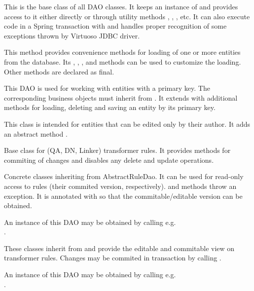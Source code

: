 \begin{description}[style=nextline,font=\ttfamily]
	\item[Dao] This is the base class of all DAO classes. It keeps an instance of  and provides access to it either directly or through utility methods , , , etc. It can also execute code in a Spring transaction with  and handles proper recognition of some exceptions thrown by Virtuoso JDBC driver.
	\item[DaoTemplate] This method provides convenience methods for loading of one or more entities from the database. Its , , ,  and  methods can be used to customize the loading. Other methods are declared as final.
	\item[DaoForEntityWithSurrogateKey] This DAO is used for working with entities with a primary key. The corresponding business objects must inherit from . It extends  with additional methods for loading, deleting and saving an entity by its primary key.
	\item[DaoForAuthorableEntity] This class is intended for entities that can be edited only by their author. It adds an abstract method .
	\item[AbstractRuleDao] Base class for (QA, DN, Linker) transformer rules. It provides methods for commiting of changes and disables any delete and update operations.
	\item[XXXRuleDao] Concrete classes inheriting from AbstractRuleDao. It can be used for read-only access to rules (their commited version, respectively).  and  methods throw an exception. It is annotated with  so that the commitable/editable version can be obtained.

		An instance of this DAO may be obtained by calling e.g.\\
		.
	\item[XXXRuleUncommittedDao] These classes inherit from  and provide the editable and commitable view on transformer rules. Changes may be commited in transaction by calling .

		An instance of this DAO may be obtained by calling e.g.\\
		.
\end{description}

